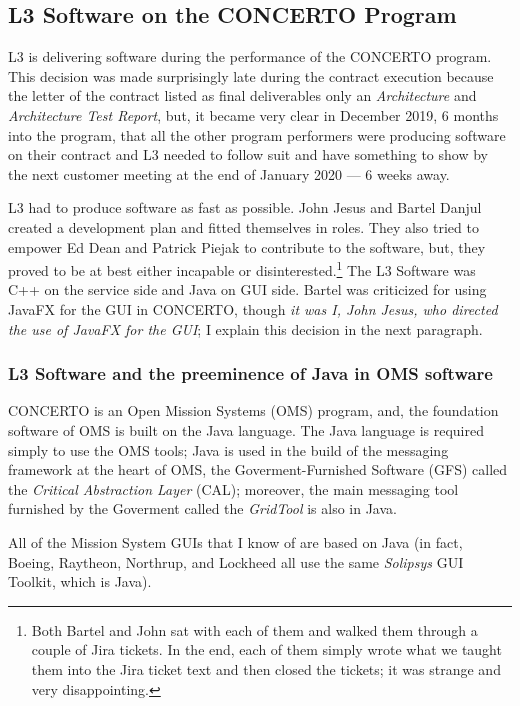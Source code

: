\documentclass[letterpaper,11pt]{texMemo} %
\begin{document}
\subsection*{L3 Software on the CONCERTO Program}

L3 is delivering software during the performance of the CONCERTO program.  This decision was made surprisingly late during the contract execution because the letter of the contract listed as final deliverables only an \emph{Architecture} and \emph{Architecture Test Report}, but, it became very clear in December 2019, 6 months into the program, that all the other program performers were producing software on their contract and L3 needed to follow suit and have something to show by the next customer meeting at the end of January 2020 --- 6 weeks away.


L3 had to produce software as fast as possible.  John Jesus and Bartel Danjul created a development plan and fitted themselves in roles.
They also tried to empower Ed Dean and Patrick Piejak to contribute to the software, but, they proved to be at best either incapable or disinterested.\footnote{Both Bartel and John sat with each of them and walked them through a couple of Jira tickets. In the end, each of them simply wrote what we taught them into the Jira ticket text and then closed the tickets; it was strange and very disappointing.}
The L3 Software was C++ on the service side and Java on GUI side.
Bartel was criticized for using JavaFX for the GUI in CONCERTO, though \emph{it was I, John Jesus, who directed the use of JavaFX for the GUI}; I explain this decision in the next paragraph.

\subsubsection*{L3 Software and the preeminence of Java in OMS software}

CONCERTO is an Open Mission Systems (OMS) program, and, the foundation software of OMS is built on the Java language.
The Java language is required simply to use the OMS tools; Java is used in the build of the messaging framework at the heart of OMS, the Goverment-Furnished Software (GFS) called the \emph{Critical Abstraction Layer} (CAL); moreover, the main messaging tool furnished by the Goverment called the \emph{GridTool} is also in Java.

All of the Mission System GUIs that I know of are based on Java (in fact, Boeing, Raytheon, Northrup, and Lockheed all use the same \emph{Solipsys} GUI Toolkit, which is Java).
\end{document}
